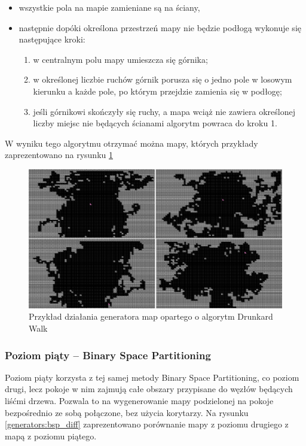 \documentclass[12pt,twoside]{article}
\begin{document}
\begin{itemize}
	\item wszystkie pola na mapie zamieniane są na ściany,
	\item następnie dopóki określona przestrzeń mapy nie będzie podłogą wykonuje się następujące kroki:
	\begin{enumerate}
		\item w centralnym polu mapy umieszcza się górnika;
		\item w określonej liczbie ruchów górnik porusza się o jedno pole w losowym kierunku a każde pole, po którym przejdzie zamienia się w podłogę;
		\item jeśli górnikowi skończyły się ruchy, a mapa wciąż nie zawiera określonej liczby miejsc nie będących ścianami algorytm powraca do kroku 1.
	\end{enumerate}	
\end{itemize}

W wyniku tego algorytmu otrzymać można mapy, których przykłady zaprezentowano na rysunku \ref{generators:drunkard_walk} 

\FloatBarrier
\begin{figure}[ht]
	\centering
	\includegraphics[width=16cm]{images/generators/drunkard_walk.png}
	\caption{Przykład działania generatora map opartego o algorytm Drunkard Walk}
	\label{generators:drunkard_walk}
\end{figure}
\FloatBarrier


\subsubsection{Poziom piąty -- Binary Space Partitioning}
Poziom piąty korzysta z tej samej metody Binary Space Partitioning, co poziom drugi, lecz pokoje w nim zajmują całe obszary przypisane do węzłów będących liśćmi drzewa. Pozwala to na wygenerowanie mapy podzielonej na pokoje bezpośrednio ze sobą połączone, bez użycia korytarzy. Na rysunku \ref{generators:bsp_diff} zaprezentowano porównanie mapy z poziomu drugiego z mapą z poziomu piątego.
	
\end{document}
